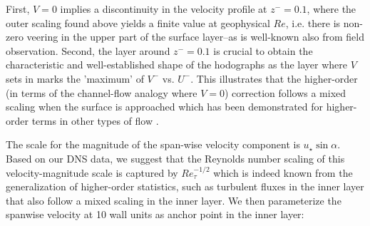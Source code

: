 \documentclass[a4paper,11pt]{amsart}
\begin{document}
First, $V=0$  implies a discontinuity in the velocity profile at $z^-=0.1$, where the outer scaling found above 
yields a finite value at geophysical $Re$, i.e. there is non-zero veering in the upper part of the
surface layer--as is well-known also from field observation. 
%
Second, the layer around $z^-=0.1$ is crucial to obtain the characteristic and well-established shape of the hodographs as the layer
where $V$ sets in marks the 'maximum' of $V^-$ vs. $U^-$.
%
This illustrates that the higher-order (in terms of the channel-flow analogy where $V=0$) correction follows a mixed scaling when the surface is
approached which has been demonstrated for higher-order terms in other types of flow \citep{mellado:BM2016}. 
%
\par
%
The scale for the magnitude of the span-wise velocity component is $u_\star\sin\alpha$. 
%
Based on our DNS data, we suggest that the Reynolds number scaling of this velocity-magnitude scale is captured
by $Re_\tau^{-1/2}$ which is indeed known from the generalization of higher-order statistics, such as turbulent fluxes
in the inner layer \citep{marusic:JFM2013} that also follow a mixed scaling in the inner layer.
%
We then parameterize the spanwise velocity at 10 wall units as anchor point in the inner layer:
\end{document}
